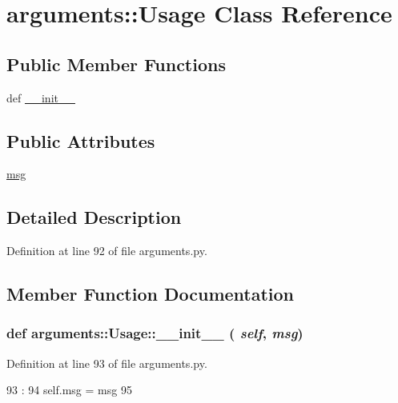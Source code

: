 \hypertarget{classarguments_1_1Usage}{
\section{arguments::Usage Class Reference}
\label{classarguments_1_1Usage}
}
\subsection*{Public Member Functions}
\begin{DoxyCompactItemize}
\item 
def \hyperlink{classarguments_1_1Usage_ab627f0baea46a6d3c4208ae36a635727}{\_\-\_\-init\_\-\_\-}
\end{DoxyCompactItemize}
\subsection*{Public Attributes}
\begin{DoxyCompactItemize}
\item 
\hyperlink{classarguments_1_1Usage_af63d211f6341db5a9376f7376eecf473}{msg}
\end{DoxyCompactItemize}


\subsection{Detailed Description}


Definition at line 92 of file arguments.py.

\subsection{Member Function Documentation}
\hypertarget{classarguments_1_1Usage_ab627f0baea46a6d3c4208ae36a635727}{
\subsubsection[{\_\-\_\-init\_\-\_\-}]{\setlength{\rightskip}{0pt plus 5cm}def arguments::Usage::\_\-\_\-init\_\-\_\- ( {\em self}, \/   {\em msg})}}
\label{classarguments_1_1Usage_ab627f0baea46a6d3c4208ae36a635727}


Definition at line 93 of file arguments.py.


\begin{DoxyCode}
93                            :
94         self.msg = msg
95 

\end{DoxyCode}


